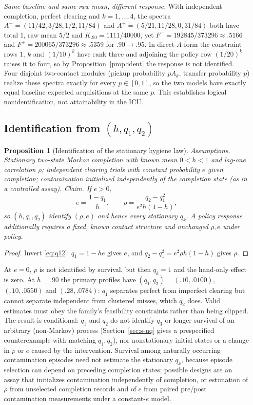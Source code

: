 \documentclass[11pt]{article}
\newtheorem{proposition}{Proposition}
\begin{document}
\emph{Same baseline and same raw mean, different response.} With independent
completion, perfect clearing and $k=1,\dots,4$, the spectra
$A^-=(11/42,3/28,1/2,11/84)$ and $A^+=(5/21,11/28,0,31/84)$ both have total 1,
raw mean $5/2$ and $K_{.90}=1111/40000$, yet
$F^-=192845/373296\approx.5166$ and $F^+=200065/373296\approx.5359$ for
.90$\to$.95. In direct-$A$ form the constraint rows $1$, $k$ and $(1/10)^k$ have
rank three and adjoining the policy row $(1/20)^k$ raises it to four, so by
Proposition~\ref{prop:ident} the response is not identified. Four disjoint two-contact modules (pickup
probability $pA_k$, transfer probability $p$) realize these spectra exactly for
every $p\in[0,1]$, so the two models have exactly equal baseline expected
acquisitions at the same $p$. This establishes logical nonidentification, not
attainability in the ICU.

\subsection{Identification from \texorpdfstring{$(h,q_1,q_2)$}{(h,q1,q2)}}\label{sec:s-proof-q12}
\begin{proposition}[Identification of the stationary hygiene law]\label{prop:q12}
\emph{Assumptions.} Stationary two-state Markov completion with known mean
$0<h<1$ and lag-one correlation $\rho$; independent clearing trials with constant
probability $e$ given completion; contamination initialized independently of
the completion state (as in a controlled assay). \emph{Claim.} If $e>0$,
\begin{equation}
e=\frac{1-q_1}{h},\qquad \rho=\frac{q_2-q_1^2}{e^2h(1-h)},
\end{equation}
so $(h,q_1,q_2)$ identify $(\rho,e)$ and hence every stationary $q_k$.
A policy response additionally requires a fixed, known contact structure and
unchanged $\rho,e$ under policy.
\end{proposition}
\begin{proof}
Invert \eqref{eq:q12}: $q_1=1-he$ gives $e$, and
$q_2-q_1^2=e^2\rho h(1-h)$ gives $\rho$.
\end{proof}
At $e=0$, $\rho$ is not identified by survival, but then $q_k=1$ and the hand-only
effect is zero. At $h=.90$ the primary profiles have $(q_1,q_2)=(.10,.0100)$,
$(.10,.0550)$ and $(.28,.0784)$: $q_1$ separates perfect from imperfect clearing
but cannot separate independent from clustered misses, which $q_2$ does. Valid
estimates must obey the family's feasibility constraints rather than being
clipped. The result is conditional: $q_1$ and $q_2$ do not identify $q_3$ or longer
survival of an arbitrary (non-Markov) process (Section~\ref{sec:s-uq} gives a
prespecified counterexample with matching $q_1,q_2$), nor nonstationary initial
states or a change in $\rho$ or $e$ caused by the intervention. Survival among
naturally occurring contamination episodes need not estimate the stationary
$q_k$, because episode selection can depend on preceding completion states;
possible designs are an assay that initializes contamination independently of
completion, or estimation of $\rho$ from unselected completion records and of $e$
from paired pre/post contamination measurements under a constant-$e$ model.
\end{document}
